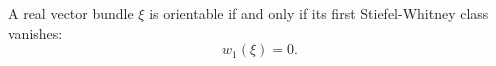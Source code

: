 A real vector bundle $\xi$ is orientable if and only if its first Stiefel-Whitney class vanishes:
$$w_1(\xi) = 0.$$
